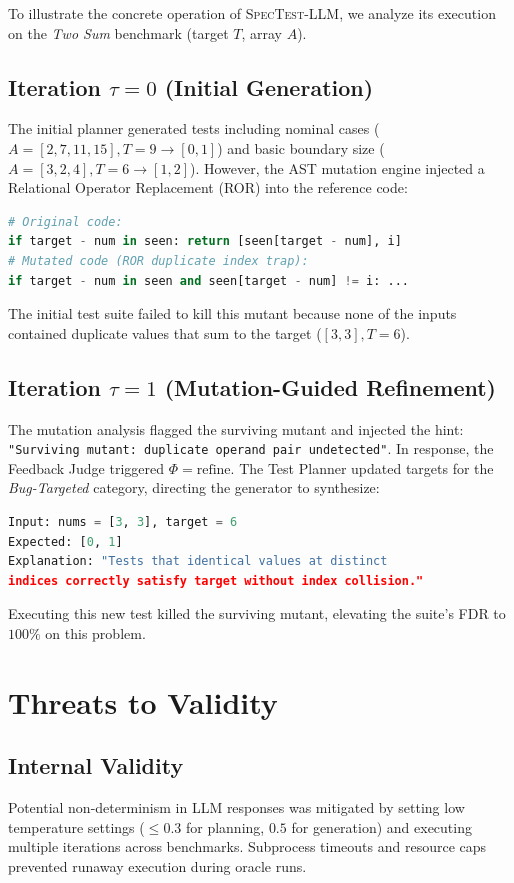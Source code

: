 \documentclass[conference]{IEEEtran}
\begin{document}
To illustrate the concrete operation of \textsc{SpecTest-LLM}, we analyze its execution on the \emph{Two Sum} benchmark (target $T$, array $A$).

\subsection{Iteration $\tau = 0$ (Initial Generation)}
The initial planner generated tests including nominal cases ($A=[2,7,11,15], T=9 \to [0,1]$) and basic boundary size ($A=[3,2,4], T=6 \to [1,2]$). 
However, the AST mutation engine injected a Relational Operator Replacement (ROR) into the reference code:
\begin{lstlisting}[language=Python]
# Original code:
if target - num in seen: return [seen[target - num], i]
# Mutated code (ROR duplicate index trap):
if target - num in seen and seen[target - num] != i: ...
\end{lstlisting}
The initial test suite failed to kill this mutant because none of the inputs contained duplicate values that sum to the target ($[3, 3], T=6$).

\subsection{Iteration $\tau = 1$ (Mutation-Guided Refinement)}
The mutation analysis flagged the surviving mutant and injected the hint:
\texttt{"Surviving mutant: duplicate operand pair undetected"}. In response, the Feedback Judge triggered $\Phi = \text{refine}$. The Test Planner updated targets for the \emph{Bug-Targeted} category, directing the generator to synthesize:
\begin{lstlisting}[language=Python]
Input: nums = [3, 3], target = 6
Expected: [0, 1]
Explanation: "Tests that identical values at distinct
indices correctly satisfy target without index collision."
\end{lstlisting}
Executing this new test killed the surviving mutant, elevating the suite's FDR to $100\%$ on this problem.

\section{Threats to Validity}
\label{sec:threats}

\subsection{Internal Validity}
Potential non-determinism in LLM responses was mitigated by setting low temperature settings ($\le 0.3$ for planning, $0.5$ for generation) and executing multiple iterations across benchmarks. Subprocess timeouts and resource caps prevented runaway execution during oracle runs.
\end{document}
